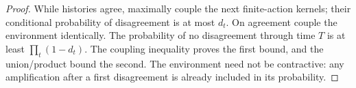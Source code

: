 \begin{proof}
While histories agree, maximally couple the next finite-action kernels;
their conditional probability of disagreement is at most $d_t$.
On agreement couple the environment identically. The probability of no
disagreement through time $T$ is at least $\prod_t(1-d_t)$. The coupling
inequality proves the first bound, and the union/product bound the second.
The environment need not be contractive: any amplification after a first
disagreement is already included in its probability.
\end{proof}
